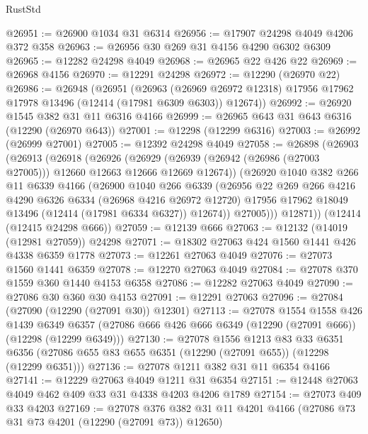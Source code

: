 \begin{lexlean}{RustStd}
\begin{coremodule}
@26951 := @26900 @1034 @31 @6314
@26956 := @17907 @24298 @4049 @4206 @372 @358
@26963 := @26956 @30 @269 @31 @4156 @4290 @6302 @6309
@26965 := @12282 @24298 @4049
@26968 := @26965 @22 @426 @22
@26969 := @26968 @4156
@26970 := @12291 @24298
@26972 := @12290 (@26970 @22)
@26986 := @26948
    (@26951
      (@26963
        (@26969 @26972 @12318)
        @17956
        @17962
        @17978
        @13496
        (@12414 (@17981 @6309 @6303))
        @12674))
@26992 := @26920 @1545 @382 @31 @11 @6316 @4166
@26999 := @26965 @643 @31 @643 @6316 (@12290 (@26970 @643))
@27001 := @12298 (@12299 @6316)
@27003 := @26992 (@26999 @27001)
@27005 := @12392 @24298 @4049
@27058 := @26898
    (@26903
      (@26913
        (@26918
          (@26926
            (@26929 (@26939 (@26942 (@26986 (@27003 @27005))) @12660 @12663 @12666 @12669 @12674))
            (@26920
              @1040
              @382
              @266
              @11
              @6339
              @4166
              (@26900
                @1040
                @266
                @6339
                (@26956
                  @22
                  @269
                  @266
                  @4216
                  @4290
                  @6326
                  @6334
                  (@26968 @4216 @26972 @12720)
                  @17956
                  @17962
                  @18049
                  @13496
                  (@12414 (@17981 @6334 @6327))
                  @12674))
              @27005)))
        @12871))
    (@12414 (@12415 @24298 @666))
@27059 := @12139 @666
@27063 := @12132 (@14019 (@12981 @27059)) @24298
@27071 := @18302 @27063 @424 @1560 @1441 @426 @4338 @6359 @1778
@27073 := @12261 @27063 @4049
@27076 := @27073 @1560 @1441 @6359
@27078 := @12270 @27063 @4049
@27084 := @27078 @370 @1559 @360 @1440 @4153 @6358
@27086 := @12282 @27063 @4049
@27090 := @27086 @30 @360 @30 @4153
@27091 := @12291 @27063
@27096 := @27084 (@27090 (@12290 (@27091 @30)) @12301)
@27113 := @27078
    @1554
    @1558
    @426
    @1439
    @6349
    @6357
    (@27086 @666 @426 @666 @6349 (@12290 (@27091 @666)) (@12298 (@12299 @6349)))
@27130 := @27078
    @1556
    @1213
    @83
    @33
    @6351
    @6356
    (@27086 @655 @83 @655 @6351 (@12290 (@27091 @655)) (@12298 (@12299 @6351)))
@27136 := @27078 @1211 @382 @31 @11 @6354 @4166
@27141 := @12229 @27063 @4049 @1211 @31 @6354
@27151 := @12448 @27063 @4049 @462 @409 @33 @31 @4338 @4203 @4206 @1789
@27154 := @27073 @409 @33 @4203
@27169 := @27078
    @376
    @382
    @31
    @11
    @4201
    @4166
    (@27086 @73 @31 @73 @4201 (@12290 (@27091 @73)) @12650)

\end{coremodule}
\end{lexlean}
